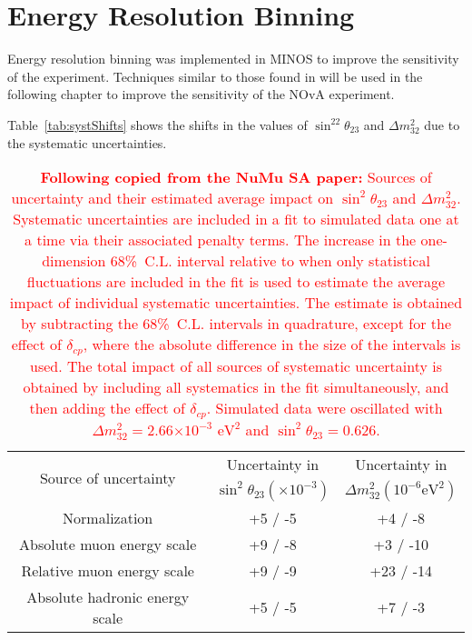 

\section{Energy Resolution Binning}

Energy resolution binning was implemented in MINOS to improve the
sensitivity of the experiment. Techniques similar to those found in
\cite{Marshall} will be used in the following chapter to improve the
sensitivity of the NOvA experiment. 


Table~\ref{tab:systShifts} shows the shifts in the values of
$\sin^22\theta_{23}$ and $\Delta m^2_{32}$ due to the systematic
uncertainties. 


\begin{table*}[t]
\caption{
\textcolor{red}{\textbf{Following copied from the NuMu SA paper: }
Sources of uncertainty and their estimated average impact on
$\sin^2\theta_{23}$ and $\Delta m^2_{32}$. Systematic uncertainties
are included in a fit to simulated data one at a time via their
associated penalty terms. The increase in the one-dimension
68\%~C.L. interval relative to when only statistical fluctuations are
included in the fit is used to estimate the average impact of
individual systematic uncertainties. The estimate is obtained by
subtracting the 68\%~C.L. intervals in quadrature, except for the
effect of $\delta_{cp}$, where the absolute difference in the size of
the intervals is used. The total impact of all sources of systematic
uncertainty is obtained by including all systematics in the fit
simultaneously, and then adding the effect of $\delta_{cp}$. Simulated
data were oscillated with $\Delta
m^2_{32}=2.66\mathord{\times}10^{-3}\text{~eV}^{2}$ and
$\sin^2\theta_{23}=0.626$.}   
}
\begin{tabular}{c c c}
\hline 
\multirow{2}{*}{Source of uncertainty} & Uncertainty in & Uncertainty in \\
& $\sin^2\!\theta_{23} (\times 10^{-3})$ & $\Delta m^2_{32}
                                           \left(10^{-6}\text{
                                           eV}^{2}\right)$ \\ 
\hline 
Normalization & +5 /  -5 & +4 / -8 \\
Absolute muon energy scale & +9 /  -8 & +3 /  -10\\
Relative muon energy scale & +9 /  -9 & +23 /  -14\\
Absolute hadronic energy scale & +5 /  -5 & +7 /  -3\\

\end{tabular}
\end{table*}
